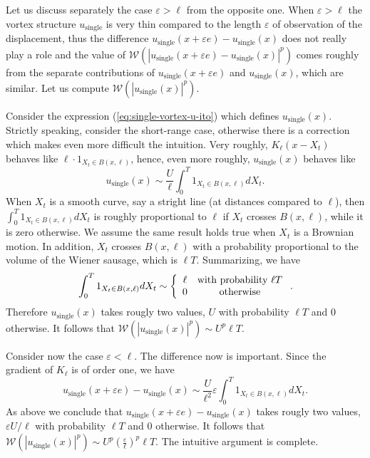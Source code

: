 \documentclass[a4paper,12pt]{article}
\begin{document}
Let us discuss separately the case $\varepsilon>\ell$ from the opposite one.
When $\varepsilon>\ell$ the vortex structure $u_{\text{single}}$ is very thin
compared to the length $\varepsilon$ of observation of the displacement, thus
the difference $u_{\text{single}}\left(  x+\varepsilon e\right)
-u_{\text{single}}\left(  x\right)  $ does not really play a role and the
value of $\mathcal{W}(\left|  u_{\text{single}}\left(  x+\varepsilon e\right)
-u_{\text{single}}\left(  x\right)  \right|  ^{p})$ comes roughly from the
separate contributions of $u_{\text{single}}\left(  x+\varepsilon e\right)  $
and $u_{\text{single}}\left(  x\right)  $, which are similar. Let us compute
$\mathcal{W}(\left|  u_{\text{single}}\left(  x\right)  \right|  ^{p})$.

Consider the expression (\ref{eq:single-vortex-u-ito}) which defines
$u_{\text{single}}(x)$. Strictly speaking, consider the short-range case,
otherwise there is a correction which makes even more difficult the intuition.
Very roughly, $K_{\ell}(x-X_{t})$ behaves like $\ell\cdot1_{X_{t}\in B\left(
x,\ell\right)  }$, hence, even more roughly, $u_{\text{single}}(x)$ behaves
like
\[
u_{\text{single}}(x)\sim\frac{U}{\ell}\int_{0}^{T}1_{X_{t}\in B\left(
x,\ell\right)  }dX_{t}.
\]
When $X_{t}$ is a smooth curve, say a stright line (at distances compared to
$\ell$), then $\int_{0}^{T}1_{X_{t}\in B\left(  x,\ell\right)  }dX_{t}$ is
roughly proportional to $\ell$ if $X_{t}$ crosses $B\left(  x,\ell\right)  $,
while it is zero otherwise. We assume the same result holds true when $X_{t}$
is a Brownian motion. In addition, $X_{t}$ crosses $B\left(  x,\ell\right)  $
with a probability proportional to the volume of the Wiener sausage, which is
$\ell T$. Summarizing, we have%
\[
\int_{0}^{T}1_{X_{t}\in B\left(  x,\ell\right)  }dX_{t}\sim\left\{
\begin{array}
[c]{cc}%
\ell & \text{with probability }\ell T\\
0 & \text{otherwise}%
\end{array}
\right.  .
\]
Therefore $u_{\text{single}}(x)$ takes rougly two values, $U$ with probability
$\ell T$ and $0$ otherwise. It follows that $\mathcal{W}(\left|
u_{\text{single}}\left(  x\right)  \right|  ^{p})\sim U^{p}\ell T$.

Consider now the case $\varepsilon<\ell$. The difference now is important.
Since the gradient of $K_{\ell}$ is of order one, we have
\[
u_{\text{single}}\left(  x+\varepsilon e\right)  -u_{\text{single}}\left(
x\right)  \sim\frac{U}{\ell^{2}}\varepsilon\int_{0}^{T}1_{X_{t}\in B\left(
x,\ell\right)  }dX_{t}.
\]
As above we conclude that $u_{\text{single}}\left(  x+\varepsilon e\right)
-u_{\text{single}}\left(  x\right)  $ takes rougly two values, $\varepsilon
{U}/{\ell}$ with probability $\ell T$ and $0$ otherwise. It follows that
$\mathcal{W}(\left|  u_{\text{single}}\left(  x\right)  \right|  ^{p})\sim
U^{p}\left(  \frac{\varepsilon}{\ell}\right)  ^{p}\ell T$. The intuitive
argument is complete.
\end{document}
